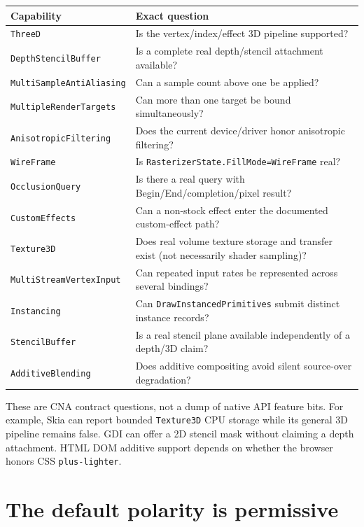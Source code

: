 \begin{center}
\small
\begin{tabularx}{\textwidth}{lX}
\toprule
Capability & Exact question \\
\midrule
\texttt{ThreeD} & Is the vertex/index/effect 3D pipeline supported? \\
\texttt{DepthStencilBuffer} & Is a complete real depth/stencil attachment available? \\
\texttt{MultiSampleAntiAliasing} & Can a sample count above one be applied? \\
\texttt{MultipleRenderTargets} & Can more than one target be bound simultaneously? \\
\texttt{AnisotropicFiltering} & Does the current device/driver honor anisotropic filtering? \\
\texttt{WireFrame} & Is \texttt{RasterizerState.FillMode=WireFrame} real? \\
\texttt{OcclusionQuery} & Is there a real query with Begin/End/completion/pixel result? \\
\texttt{CustomEffects} & Can a non-stock effect enter the documented custom-effect path? \\
\texttt{Texture3D} & Does real volume texture storage and transfer exist (not necessarily shader sampling)? \\
\texttt{MultiStreamVertexInput} & Can repeated input rates be represented across several bindings? \\
\texttt{Instancing} & Can \texttt{DrawInstancedPrimitives} submit distinct instance records? \\
\texttt{StencilBuffer} & Is a real stencil plane available independently of a depth/3D claim? \\
\texttt{AdditiveBlending} & Does additive compositing avoid silent source-over degradation? \\
\bottomrule
\end{tabularx}
\end{center}

These are CNA contract questions, not a dump of native API feature bits.  For example, Skia can
report bounded \texttt{Texture3D} CPU storage while its general 3D pipeline remains false.  GDI can
offer a 2D stencil mask without claiming a depth attachment.  HTML DOM additive support depends on
whether the browser honors CSS \texttt{plus-lighter}.

\section{The default polarity is permissive}

